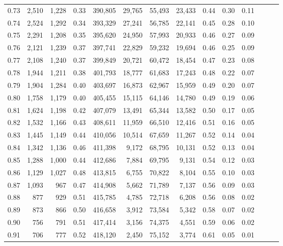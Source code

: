 \begin{tabular}{rrrrrrrrrrrrrr}
0.73 &  2,510 &  1,228 &  0.33 &  390,805 &   29,765 &  55,493 &  23,433 &  0.44 &  0.30 &      0.11 \\
0.74 &  2,524 &  1,292 &  0.34 &  393,329 &   27,241 &  56,785 &  22,141 &  0.45 &  0.28 &      0.10 \\
0.75 &  2,291 &  1,208 &  0.35 &  395,620 &   24,950 &  57,993 &  20,933 &  0.46 &  0.27 &      0.09 \\
0.76 &  2,121 &  1,239 &  0.37 &  397,741 &   22,829 &  59,232 &  19,694 &  0.46 &  0.25 &      0.09 \\
0.77 &  2,108 &  1,240 &  0.37 &  399,849 &   20,721 &  60,472 &  18,454 &  0.47 &  0.23 &      0.08 \\
0.78 &  1,944 &  1,211 &  0.38 &  401,793 &   18,777 &  61,683 &  17,243 &  0.48 &  0.22 &      0.07 \\
0.79 &  1,904 &  1,284 &  0.40 &  403,697 &   16,873 &  62,967 &  15,959 &  0.49 &  0.20 &      0.07 \\
0.80 &  1,758 &  1,179 &  0.40 &  405,455 &   15,115 &  64,146 &  14,780 &  0.49 &  0.19 &      0.06 \\
0.81 &  1,624 &  1,198 &  0.42 &  407,079 &   13,491 &  65,344 &  13,582 &  0.50 &  0.17 &      0.05 \\
0.82 &  1,532 &  1,166 &  0.43 &  408,611 &   11,959 &  66,510 &  12,416 &  0.51 &  0.16 &      0.05 \\
0.83 &  1,445 &  1,149 &  0.44 &  410,056 &   10,514 &  67,659 &  11,267 &  0.52 &  0.14 &      0.04 \\
0.84 &  1,342 &  1,136 &  0.46 &  411,398 &    9,172 &  68,795 &  10,131 &  0.52 &  0.13 &      0.04 \\
0.85 &  1,288 &  1,000 &  0.44 &  412,686 &    7,884 &  69,795 &   9,131 &  0.54 &  0.12 &      0.03 \\
0.86 &  1,129 &  1,027 &  0.48 &  413,815 &    6,755 &  70,822 &   8,104 &  0.55 &  0.10 &      0.03 \\
0.87 &  1,093 &    967 &  0.47 &  414,908 &    5,662 &  71,789 &   7,137 &  0.56 &  0.09 &      0.03 \\
0.88 &    877 &    929 &  0.51 &  415,785 &    4,785 &  72,718 &   6,208 &  0.56 &  0.08 &      0.02 \\
0.89 &    873 &    866 &  0.50 &  416,658 &    3,912 &  73,584 &   5,342 &  0.58 &  0.07 &      0.02 \\
0.90 &    756 &    791 &  0.51 &  417,414 &    3,156 &  74,375 &   4,551 &  0.59 &  0.06 &      0.02 \\
0.91 &    706 &    777 &  0.52 &  418,120 &    2,450 &  75,152 &   3,774 &  0.61 &  0.05 &      0.01 \\

\end{tabular}
